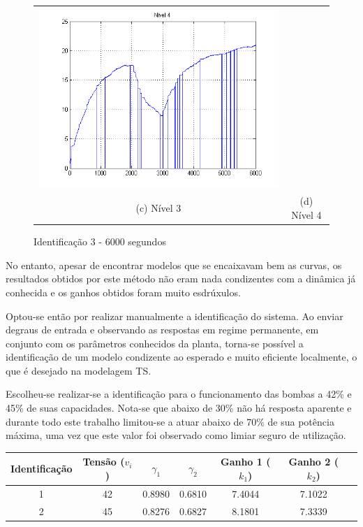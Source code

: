 \begin{figure}[H]
\begin{tabular}{cc}
		\includegraphics[height=0.15\paperheight,keepaspectratio]{img/sim3_h4.png} \\
		(c) Nível 3 &
		(d) Nível 4
	\end{tabular}
	\caption{\label{imgID_6000} Identificação 3 - 6000 segundos}
\end{figure}

No entanto, apesar de encontrar modelos que se encaixavam bem as curvas, os resultados obtidos por este método não eram nada condizentes com a dinâmica já conhecida e os ganhos obtidos foram muito esdrúxulos.

Optou-se então por realizar manualmente a identificação do sistema. Ao enviar degraus de entrada e observando as respostas em regime permanente, em conjunto com os parâmetros conhecidos da planta, torna-se possível a identificação de um modelo condizente ao esperado e muito eficiente localmente, o que é desejado na modelagem TS.

Escolheu-se realizar-se a identificação para o funcionamento das bombas a 42\% e 45\% de suas capacidades. Nota-se que abaixo de 30\% não há resposta aparente e durante todo este trabalho limitou-se a atuar abaixo de 70\% de sua potência máxima, uma vez que este valor foi observado como limiar seguro de utilização.

\begin{center} \label{tabIdentKs}
	\begin{tabular}{|c|c|c|c|c|c|c|}
		\hline
		Identificação & Tensão ($v_i$)&  $\gamma_1$ & $\gamma_2$ & Ganho 1 ($k_1$) & Ganho 2 ($k_2$) \\ \hline
		1 & 42 & 0.8980 & 0.6810 & 7.4044 & 7.1022 \\ \hline
		2 & 45 & 0.8276 & 0.6827 & 8.1801 & 7.3339 \\ \hline
	\end{tabular}
\end{center}

